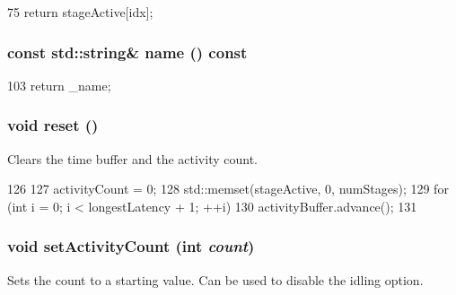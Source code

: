 \begin{DoxyCode}
75 { return stageActive[idx]; }
\end{DoxyCode}
\hypertarget{classActivityRecorder_a324e8c54c4c5161913681a1a52fef959}{
\subsubsection[{name}]{\setlength{\rightskip}{0pt plus 5cm}const std::string\& name () const}}
\label{classActivityRecorder_a324e8c54c4c5161913681a1a52fef959}



\begin{DoxyCode}
103 { return _name; }
\end{DoxyCode}
\hypertarget{classActivityRecorder_ad20897c5c8bd47f5d4005989bead0e55}{
\subsubsection[{reset}]{\setlength{\rightskip}{0pt plus 5cm}void reset ()}}
\label{classActivityRecorder_ad20897c5c8bd47f5d4005989bead0e55}
Clears the time buffer and the activity count. 


\begin{DoxyCode}
126 {
127     activityCount = 0;
128     std::memset(stageActive, 0, numStages);
129     for (int i = 0; i < longestLatency + 1; ++i)
130         activityBuffer.advance();
131 }
\end{DoxyCode}
\hypertarget{classActivityRecorder_a562d654f23b8a293deda98e8d585973f}{
\subsubsection[{setActivityCount}]{\setlength{\rightskip}{0pt plus 5cm}void setActivityCount (int {\em count})}}
\label{classActivityRecorder_a562d654f23b8a293deda98e8d585973f}
Sets the count to a starting value. Can be used to disable the idling option. 


